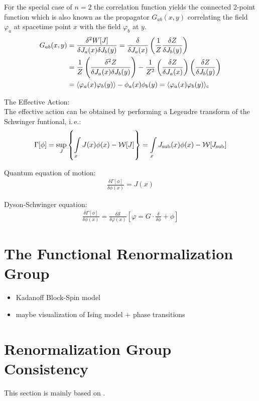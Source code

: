 For the special case of $n=2$ the correlation function yields the connected 2-point function which is also known as the propagator $G_{ab}(x, y)$ correlating the field $\varphi_a$ at spacetime point $x$ with the field $\varphi_b$ at $y$.
\begin{align}
	G_{ab}(x, y) &= \frac{\delta^2W[J]}{\delta J_a(x)\delta J_b(y)} = \frac{\delta}{\delta J_a(x)}\left(\frac{1}{Z}\frac{\delta Z}{\delta J_b(y)}\right) \nonumber \\
				&= \frac{1}{Z}\left(\frac{\delta^2Z}{\delta J_a(x)\delta J_b(y)}\right) - \frac{1}{Z^2}\left(\frac{\delta Z}{\delta J_a(x)}\right)\left(\frac{\delta Z}{\delta J_b(y)}\right)\\
				&= \langle \varphi_a(x)\varphi_b(y) \rangle - \phi_a(x)\phi_b(y) = \langle \varphi_a(x)\varphi_b(y) \rangle_{\text{c}}	\nonumber	
\end{align}

The Effective Action:\\

The effective action can be obtained by performing a Legendre transform of the Schwinger funtional, i.\,e.:
\begin{align}
\Gamma[\phi] = \underset{J}{\operatorname{sup}}\left\{ \int\limits_x J(x)\phi(x) - \mathcal{W}[J] \right\} = \int\limits_x J_{\text{sub}}(x)\phi(x) - \mathcal{W}[J_{\text{sub}}]
\end{align}

Quantum equation of motion:
\begin{align}
\frac{\delta\Gamma[\phi]}{\delta\phi(x)} = J(x)	
\end{align}

Dyson-Schwinger equation:
\begin{align}
\frac{\delta\Gamma[\phi]}{\delta\phi(x)} = \frac{\delta\mathcal{S}}{\delta\varphi(x)} \left[\varphi = G \cdot \frac{\delta}{\delta\phi} + \phi \right]
\end{align}

\section{The Functional Renormalization Group}
\begin{itemize}
	\item Kadanoff Block-Spin model 
	\item maybe visualization of Ising model + phase transitions
\end{itemize}

\section{Renormalization Group Consistency}
This section is mainly based on \cite{BraunLeonhardtPawlowski2018}.

